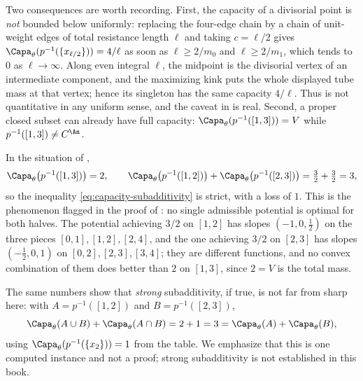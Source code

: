 \begin{example}
Two consequences are worth recording.  First, the capacity of a divisorial
point is \emph{not} bounded below uniformly: replacing the four-edge chain
by a chain of unit-weight edges of total resistance length \(\ell\)
and taking \(c=\ell/2\) gives
\(\Capa_\theta(p^{-1}(\{x_{\ell/2}\}))=4/\ell\) as soon as
\(\ell\geq2/m_0\) and \(\ell\geq2/m_1\), which tends to \(0\) as
\(\ell\to\infty\).  Along even integral \(\ell\), the midpoint is the
divisorial vertex of an intermediate component, and the maximizing kink
puts the whole displayed tube mass at that vertex; hence its singleton has
the same capacity \(4/\ell\).  Thus
 is not
quantitative in any uniform sense, and the caveat in
 is real.  Second, a proper closed subset
can already have full capacity: \(\Capa_\theta(p^{-1}([1,3]))=V\) while
\(p^{-1}([1,3])\neq C^{\An}\).
\end{example}

\begin{example}
\label{ex:ch25-subadditivity-strict}
In the situation of ,
\[
 \Capa_\theta\bigl(p^{-1}([1,3])\bigr)=2,
 \qquad
 \Capa_\theta\bigl(p^{-1}([1,2])\bigr)
 +\Capa_\theta\bigl(p^{-1}([2,3])\bigr)=\tfrac32+\tfrac32=3 ,
\]
so the inequality \eqref{eq:capacity-subadditivity} is strict, with a loss of
\(1\).  This is the phenomenon flagged in the proof of
: no single admissible potential is optimal
for both halves.  The potential achieving \(3/2\) on \([1,2]\) has slopes
\((-1,0,\tfrac12)\) on the three pieces \([0,1],[1,2],[2,4]\), and the one
achieving \(3/2\) on \([2,3]\) has slopes
\((-\tfrac12,0,1)\) on \([0,2],[2,3],[3,4]\); they are different functions,
and no convex combination of them does better than \(2\) on \([1,3]\), since
\(2=V\) is the total mass.

The same numbers show that \emph{strong} subadditivity, if true, is not far
from sharp here: with \(A=p^{-1}([1,2])\) and \(B=p^{-1}([2,3])\),
\[
 \Capa_\theta(A\cup B)+\Capa_\theta(A\cap B)=2+1=3
 =\Capa_\theta(A)+\Capa_\theta(B),
\]
using \(\Capa_\theta(p^{-1}(\{x_2\}))=1\) from the table.  We emphasize that
this is one computed instance and not a proof; strong subadditivity is not
established in this book.
\end{example}

